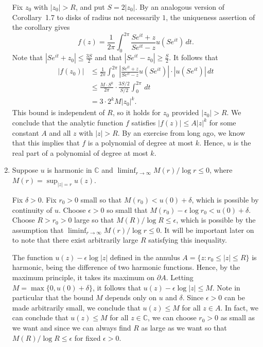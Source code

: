 \documentclass[11pt]{book}
\theoremstyle{definition}
\begin{document}
\begin{enumerate}
    Fix $z_0$ with $|z_0| > R$, and put $S = 2|z_0|$.  By an analogous version of Corollary~1.7 to disks of radius not necessarily $1$, the uniqueness assertion of the corollary gives 
    \[ f(z) = \frac{1}{2\pi} \int_0^{2\pi} \frac{Se^{it} + z}{Se^{it} -z} u(Se^{it}) \, dt.\]  Note that $|Se^{it} + z_0| \leq \tfrac{3S}{2}$ and that $|Se^{it}- z_0| \geq \tfrac S 2$.  It follows that 
    \begin{align*}
      |f(z_0)| &\leq \frac{1}{2\pi} \int_{0}^{2\pi} \left|   \frac{Se^{it} + z}{Se^{it} -z} u(Se^{it}) \right| \cdot |u(Se^{it})| \, dt \\
      & \leq \frac{M\cdot S^k}{2\pi} \cdot \frac{3S/2}{S/2}\int_0^{2\pi}  \, dt \\
      &= 3\cdot 2^k  M |z_0|^k. 
    \end{align*}
    This bound is independent of $R$, so it holds for $z_0$ provided $|z_0| > R$.  We conclude that the analytic function $f$ satisfies  $|f(z)| \leq A |z|^k$ for some constant $A$ and all $z$ with $|z| > R$.  By an exercise from long ago, we know that this implies that $f$ is a polynomial of degree at most $k$.  Hence, $u$ is the real part of a polynomial of degree at most $k$. 
  
  \item   Suppose $u$ is harmonic in $\mathbb C$ and $\liminf_{r\rightarrow \infty} M(r) / \log r \leq 0$, where $M(r) = \sup_{|z|=r} u(z)$.  

    Fix $\delta > 0$.  Fix $r_0 > 0$ small so that $M(r_0) < u(0) + \delta$, which is possible by continuity of $u$.  Choose $\epsilon > 0$ so small that $M(r_0) - \epsilon \log r_0 < u(0) + \delta$.  Choose $R>r_0 > 0$ large so that $M(R) / \log R \leq \epsilon$, which is possible by the assumption that $\liminf_{r\rightarrow \infty} M(r) / \log r \leq 0$.   It will be important later on to note that there exist arbitrarily large $R$ satisfying this inequality.  

    The function $u(z) - \epsilon \log |z|$ defined in the annulus $A = \{ z : r_0 \leq |z| \leq R \}$ is harmonic, being the difference of two harmonic functions.  Hence, by the maximum principle, it takes its maximum on $\partial A$.  Letting $M = \max \{ 0, u(0) + \delta \}$, it follows that $u(z) - \epsilon \log |z| \leq M$.  Note in particular that the bound $M$ depends only on $u$ and $\delta$. Since $\epsilon > 0$ can be made arbitrarily small, we conclude that $u(z) \leq M$ for all $z\in A$.  In fact, we can conclude that $u(z) \leq M$ for all $z\in \mathbb C$, we can choose $r_0>0$ as small as we want and since we can always find $R$ as large as we want so that $M(R) / \log R \leq \epsilon$ for fixed $\epsilon>0$.


\end{enumerate}
\end{document}
